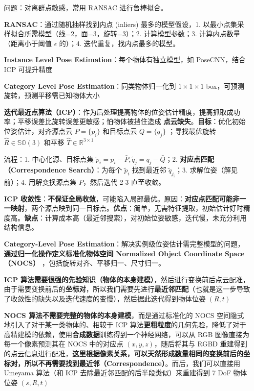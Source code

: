 \documentclass[
  8pt]{extarticle}
\begin{document}
\begin{multicols*}{4}
问题：对离群点敏感，常用 RANSAC 进行鲁棒拟合。

\textbf{RANSAC}：通过随机抽样找到内点 (inliers) 最多的模型假设，1.
以最小点集采样拟合所需模型（线=2，面=3，旋转=3）；2. 计算模型参数；3.
计算内点数量（距离小于阈值 \(\epsilon\) 的）；4.
迭代重复，找内点最多的模型。

\textbf{Instance Level Pose Estimation}：每个物体有独立模型，如
PoseCNN，结合 ICP 可提升精度

\textbf{Category Level Pose Estimation}：同类物体归一化到
\(1\times1\times1\) box，可预测旋转，预测平移需已知物体大小

\textbf{迭代最近点算法（ICP）}：作为后处理提高物体的位姿估计精度，提高抓取成功率；平移误差比旋转误差更敏感；怕物体被挡住造成
\textbf{点云缺失}。\textbf{目标}：优化初始位姿估计，对齐源点云
\(P = \{p_i\}\) 和目标点云 \(Q = \{q_j\}\) ；寻找最优旋转
\(\hat{R} \in\mathbb{SO}(3)\) 和平移
\(\hat{T}\in\mathbb{R}^{3\times 1}\)

流程：1. 中心化源、目标点集
\(\tilde{p}_i = p_i - \bar{P}, \tilde{q}_j = q_j - \bar{Q}\)；2.
\textbf{对应点匹配（Correspondence Search）}：为每个 \(\tilde{p}_i\)
找到最近邻 \(\tilde{q}_{j_i}\)；3. 求解位姿（解见前）；4. 用解变换源点集
\(P\)，然后迭代 2-3 直至收敛。

\textbf{ICP
收敛性}：\textbf{不保证全局收敛}，可能陷入局部最优。原因：\textbf{对应点匹配可能非一一映射}，两个源点映到同一目标点。\textbf{优点}：简单，无需特征提取，初始估计好时精度高。\textbf{缺点}：计算成本高（最近邻搜索），对初始位姿敏感，迭代慢，未充分利用结构信息。

\textbf{Category-Level Pose
Estimation}：解决实例级位姿估计需完整模型的问题，\textbf{通过归一化操作定义标准化物体空间
Normalized Object Coordinate Space（NOCS）}
，包括旋转对齐、平移归一、尺寸归一。

\textbf{ICP
算法需要很强的先验知识（物体的本身建模）}，然后进行变换前后点云配准，由于需要变换前后的\textbf{坐标对}，所以我们需要先进行\textbf{最近邻匹配}（也就是这一步导致了收敛性的缺失以及迭代速度的变慢），然后据此迭代得到物体位姿
\((R,t)\)

\textbf{NOCS 算法不需要完整的物体的本身建模}，而是通过标准化的 NOCS
空间隐式地引入了对于某一类物体的、相较于 ICP
算法\textbf{更粗粒度}的几何先验，降低了对于高精建模的依赖，使用\textbf{合成数据}训练得到一个神经网络，可以从
RGB 图像直接为每一个像素预测其在 NOCS 中的对应点 \((x,y,z)\)，随后将其与
RGBD
重建得到的点云信息进行配准，\textbf{这里根据像素关系，可以天然形成数量相同的变换前后的坐标对，所以不再需要找到最近邻（Correspondence）}。而后，我们可以直接用
Umeyama 算法（和 ICP 去除最近邻匹配的后半段类似）来重建得到 7 DoF
物体位姿 \((s,R,t)\)


\end{multicols*}
\end{document}
